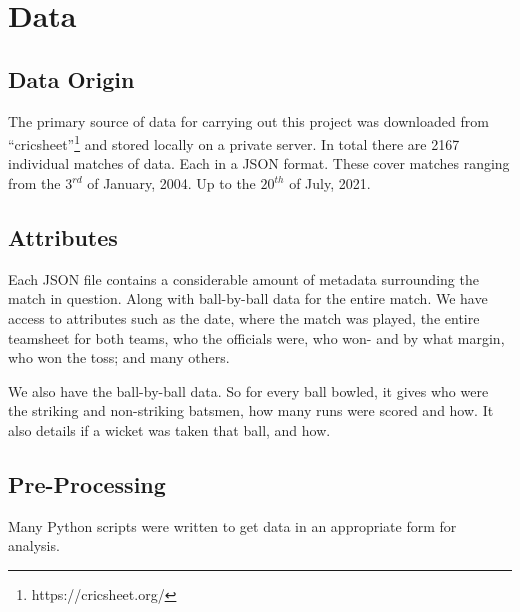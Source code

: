\chapter{Data}

\section{Data Origin}
The primary source of data for carrying out this project was downloaded from ``cricsheet''\footnote{https://cricsheet.org/}
and stored locally on a private server. In total there are 2167 individual matches of data. Each in a JSON format.
These cover matches ranging from the $3^{rd}$ of January, 2004. Up to the $20^{th}$ of July, 2021.

\section{Attributes}
Each JSON file contains a considerable amount of metadata surrounding the match in question. Along with 
ball-by-ball data for the entire match. We have access to attributes such as the date, where the match was played,
the entire teamsheet for both teams, who the officials were, who won- and by what margin, who won the toss; and many others.

We also have the ball-by-ball data. So for every ball bowled, it gives who were the striking and non-striking batsmen, how many runs
were scored and how. It also details if a wicket was taken that ball, and how.

\section{Pre-Processing}
Many Python scripts were written to get data in an appropriate form for analysis. 
